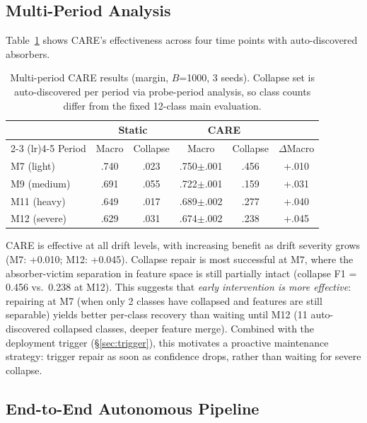 \documentclass[journal]{IEEEtran}
\newcommand{\ours}{CARE}  %
\begin{document}
\subsection{Multi-Period Analysis}

Table~\ref{tab:multiperiod} shows \ours{}'s effectiveness across four time points with auto-discovered absorbers.

\begin{table}[t]
\centering
\caption{Multi-period CARE results (margin, $B$=1000, 3 seeds). Collapse set is auto-discovered per period via probe-period analysis, so class counts differ from the fixed 12-class main evaluation.}
\label{tab:multiperiod}
\small
\begin{tabular}{@{}l cc cc c@{}}
\toprule
& \multicolumn{2}{c}{Static} & \multicolumn{2}{c}{\ours{}} & \\
\cmidrule(lr){2-3} \cmidrule(lr){4-5}
Period & Macro & Collapse & Macro & Collapse & $\Delta$Macro \\
\midrule
M7 (light)  & .740 & .023 & .750$\pm$.001 & .456 & +.010 \\
M9 (medium) & .691 & .055 & .722$\pm$.001 & .159 & +.031 \\
M11 (heavy) & .649 & .017 & .689$\pm$.002 & .277 & +.040 \\
M12 (severe)& .629 & .031 & .674$\pm$.002 & .238 & +.045 \\
\bottomrule
\end{tabular}
\end{table}

\ours{} is effective at all drift levels, with increasing benefit as drift severity grows (M7: +0.010; M12: +0.045). Collapse repair is most successful at M7, where the absorber-victim separation in feature space is still partially intact (collapse F1 = 0.456 vs.\ 0.238 at M12).
This suggests that \textit{early intervention is more effective}: repairing at M7 (when only 2 classes have collapsed and features are still separable) yields better per-class recovery than waiting until M12 (11 auto-discovered collapsed classes, deeper feature merge). Combined with the deployment trigger (\S\ref{sec:trigger}), this motivates a proactive maintenance strategy: trigger repair as soon as confidence drops, rather than waiting for severe collapse.

\subsection{End-to-End Autonomous Pipeline}
\label{sec:e2e}
\end{document}
